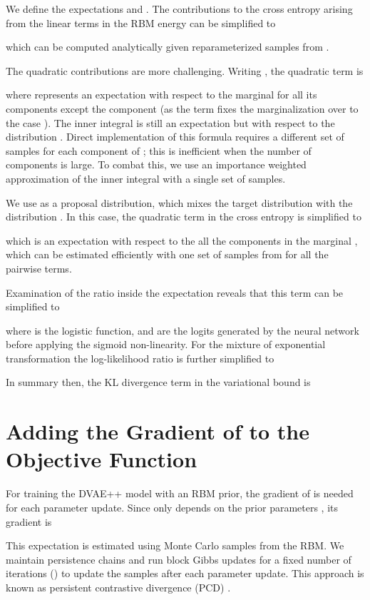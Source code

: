 \documentclass{article}
\begin{document}
We define the expectations  and .
The contributions to the cross entropy arising from the linear terms in the RBM energy can be simplified to

which can be computed analytically given reparameterized samples from .

The quadratic contributions are more challenging. Writing ,
the quadratic term is

where  represents an expectation with respect to
the marginal  for all its components except the  component (as the term  fixes the marginalization over  to
the case ). The inner integral is still an expectation but with respect to the  distribution . Direct 
implementation of this formula requires a different set of samples for each component of ;
this is inefficient when the number of components is large. To combat this, we use an importance weighted approximation of the inner integral 
with a single set of samples.

We use  as a proposal distribution,
which mixes the target distribution  with the distribution .
In this case, the quadratic term in the cross entropy is simplified to

which is an expectation with respect to the all the components in the marginal ,
which can be estimated efficiently with one set of samples from  for all the pairwise terms.

Examination of the ratio inside the expectation reveals that this term can be simplified to

where  is the logistic function, and  are the logits generated by the neural network before applying
the sigmoid non-linearity. For the mixture of exponential transformation the log-likelihood ratio is further simplified to


In summary then, the KL divergence term in the variational bound is

\fi

\section{Adding the Gradient of  to the Objective Function} \label{app:gradZ}

For training the DVAE++ model with an RBM prior, the gradient of  is needed for each parameter update.
Since  only depends on the prior parameters , its gradient is

This expectation is estimated using Monte Carlo samples from the RBM. We maintain persistence chains and run block Gibbs updates for 
a fixed number of iterations () to update the samples after each parameter update. This approach is known as 
persistent contrastive divergence (PCD) \cite{younes1989parametric, tieleman2008training}. 
\end{document}
